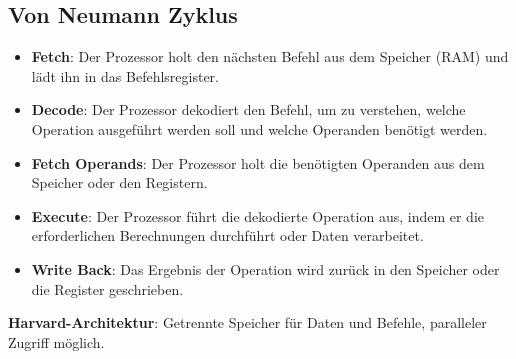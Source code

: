 \documentclass[8pt, landscape]{article}
\newcommand{\datastruct}[1]{\textbf{\textcolor{red!60!black}{#1}}}
\begin{document}
\begin{multicols*}{4}
\section{Von Neumann Zyklus}
\begin{itemize}
    \item \datastruct{Fetch}: Der Prozessor holt den nächsten Befehl aus dem Speicher (RAM) und lädt ihn in das Befehlsregister.
    \item \datastruct{Decode}: Der Prozessor dekodiert den Befehl, um zu verstehen, welche Operation ausgeführt werden soll und welche Operanden benötigt werden.
    \item \datastruct{Fetch Operands}: Der Prozessor holt die benötigten Operanden aus dem Speicher oder den Registern.
    \item \datastruct{Execute}: Der Prozessor führt die dekodierte Operation aus, indem er die erforderlichen Berechnungen durchführt oder Daten verarbeitet.
    \item \datastruct{Write Back}: Das Ergebnis der Operation wird zurück in den Speicher oder die Register geschrieben.
\end{itemize}

\textbf{Harvard-Architektur}: Getrennte Speicher für Daten und Befehle, paralleler Zugriff möglich.



\end{multicols*}
\end{document}
